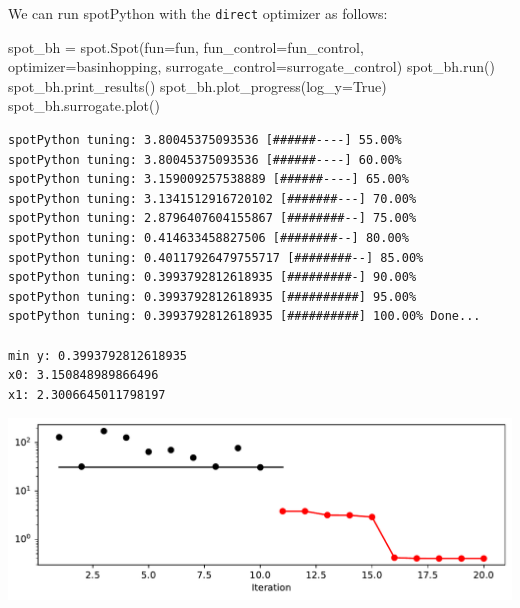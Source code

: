 \documentclass[
  letterpaper,
  DIV=11,
  numbers=noendperiod]{scrreprt}
\newenvironment{Shaded}{\begin{snugshade}}{\end{snugshade}}
\newcommand{\NormalTok}[1]{\textcolor[rgb]{0.00,0.23,0.31}{#1}}
\newcommand{\OperatorTok}[1]{\textcolor[rgb]{0.37,0.37,0.37}{#1}}
\newcommand{\VariableTok}[1]{\textcolor[rgb]{0.07,0.07,0.07}{#1}}
\begin{document}
\begin{tcolorbox}[enhanced jigsaw, left=2mm, opacitybacktitle=0.6, leftrule=.75mm, toptitle=1mm, opacityback=0, colback=white, rightrule=.15mm, colframe=quarto-callout-tip-color-frame, title=\textcolor{quarto-callout-tip-color}{\faLightbulb}\hspace{0.5em}{Tip: Selecting the Optimizer for the Surrogate}, toprule=.15mm, coltitle=black, bottomrule=.15mm, bottomtitle=1mm, colbacktitle=quarto-callout-tip-color!10!white, titlerule=0mm, breakable, arc=.35mm]

We can run spotPython with the \texttt{direct} optimizer as follows:

\begin{Shaded}
\begin{Highlighting}[]
\NormalTok{spot\_bh }\OperatorTok{=}\NormalTok{ spot.Spot(fun}\OperatorTok{=}\NormalTok{fun,}
\NormalTok{                    fun\_control}\OperatorTok{=}\NormalTok{fun\_control,}
\NormalTok{                    optimizer}\OperatorTok{=}\NormalTok{basinhopping,}
\NormalTok{                    surrogate\_control}\OperatorTok{=}\NormalTok{surrogate\_control)}
\NormalTok{spot\_bh.run()}
\NormalTok{spot\_bh.print\_results()}
\NormalTok{spot\_bh.plot\_progress(log\_y}\OperatorTok{=}\VariableTok{True}\NormalTok{)}
\NormalTok{spot\_bh.surrogate.plot()}
\end{Highlighting}
\end{Shaded}

\begin{verbatim}
spotPython tuning: 3.80045375093536 [######----] 55.00% 
spotPython tuning: 3.80045375093536 [######----] 60.00% 
spotPython tuning: 3.159009257538889 [######----] 65.00% 
spotPython tuning: 3.1341512916720102 [#######---] 70.00% 
spotPython tuning: 2.8796407604155867 [########--] 75.00% 
spotPython tuning: 0.414633458827506 [########--] 80.00% 
spotPython tuning: 0.40117926479755717 [########--] 85.00% 
spotPython tuning: 0.3993792812618935 [#########-] 90.00% 
spotPython tuning: 0.3993792812618935 [##########] 95.00% 
spotPython tuning: 0.3993792812618935 [##########] 100.00% Done...

min y: 0.3993792812618935
x0: 3.150848989866496
x1: 2.3006645011798197
\end{verbatim}

\includegraphics{004_spot_sklearn_optimization_files/figure-pdf/cell-12-output-2.pdf}


\end{tcolorbox}
\end{document}
